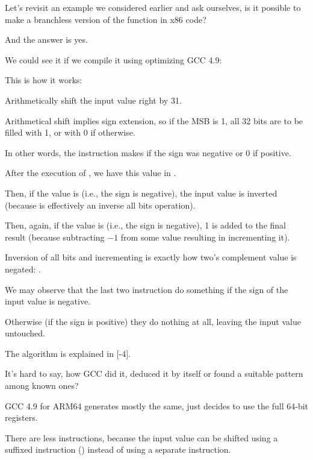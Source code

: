 \label{chap:branchless_abs}

Let's revisit an example we considered earlier  and ask ourselves, is it possible
to make a branchless version of the function in x86 code?



And the answer is yes.


We could see it if we compile it using optimizing GCC 4.9:



This is how it works:

Arithmetically shift the input value right by 31.

Arithmetical shift implies sign extension, so if the \ac{MSB} is 1, 
all 32 bits are to be filled with 1, or with 0 if otherwise.

In other words, the  instruction makes  if the sign was negative or 0 if positive.

After the execution of , we have this value in \EDX.

Then, if the value is  (i.e., the sign is negative), the input value is inverted 
(because  is effectively an inverse all bits operation).

Then, again, if the value is  (i.e., the sign is negative), 1 is added to the final result (because
subtracting $-1$ from some value resulting in incrementing it).

Inversion of all bits and incrementing is exactly how two's complement value is negated: 
.

We may observe that the last two instruction do something if the sign of the input value is negative.

Otherwise (if the sign is positive) they do nothing at all, leaving the input value untouched.

The algorithm is explained in [-4].

It's hard to say, how GCC did it, deduced it by itself or found a suitable pattern among known ones?


GCC 4.9 for ARM64 generates mostly the same, just decides to use the full 64-bit registers.

There are less instructions, because the input value can be shifted using a suffixed instruction ()
instead of using a separate instruction.


